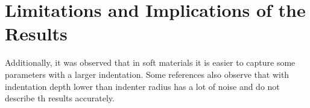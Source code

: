 \section{Limitations and Implications of the Results}






 Additionally, it was observed that in soft materials it is easier to capture 
 some parameters with a larger indentation. Some references also observe that with
 indentation depth lower than indenter radius has a lot of noise and do not describe
 th results accurately. %

